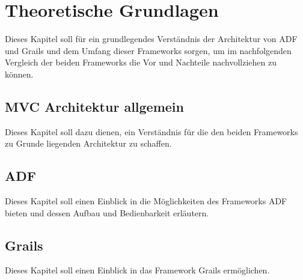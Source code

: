 \section{Theoretische Grundlagen}
Dieses Kapitel soll für ein grundlegendes Verständnis der Architektur von ADF und Grails und dem Umfang dieser Frameworks sorgen, um im nachfolgenden Vergleich der beiden Frameworks die Vor und Nachteile nachvollziehen zu können.
\subsection{MVC Architektur allgemein}
Dieses Kapitel soll dazu dienen, ein Verständnis für die den beiden Frameworks zu Grunde liegenden Architektur zu schaffen.
\subsection{ADF}
Dieses Kapitel soll einen Einblick in die Möglichkeiten des Frameworks ADF bieten und dessen Aufbau und Bedienbarkeit erläutern.
\subsection{Grails}
Dieses Kapitel soll einen Einblick in das Framework Grails ermöglichen.